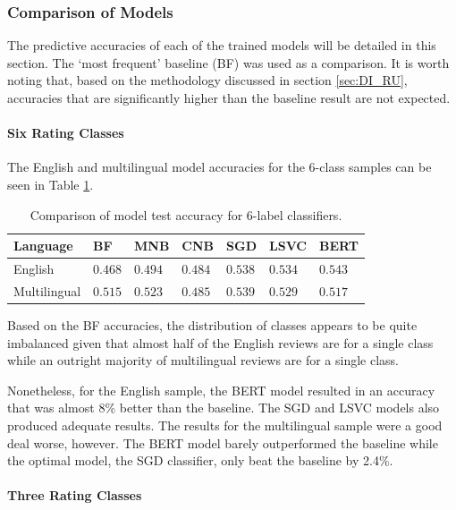 \subsubsection{Comparison of Models}

The predictive accuracies of each of the trained models will be detailed in this section. The `most frequent' baseline (BF) was used as a comparison. It is worth noting that, based on the methodology discussed in section \ref{sec:DI_RU}, accuracies that are significantly higher than the baseline result are not expected.

\paragraph{Six Rating Classes}

The English and multilingual model accuracies for the 6-class samples can be seen in Table \ref{tab:Res_PU_Comp6}.

\begin{table}[ht]
    \centering
    \begin{tabular}{l | l l l l l l}
        \toprule
        \textbf{Language} & \textbf{BF} & \textbf{MNB} & \textbf{CNB} & \textbf{SGD} & \textbf{LSVC} & \textbf{BERT}\\\midrule
        English&$0.468$&$0.494$&$0.484$&$0.538$&$0.534$&$\mathbf{0.543}$\\
        Multilingual&$0.515$&$0.523$&$0.485$&$\mathbf{0.539}$&$0.529$&$0.517$\\
        \bottomrule
    \end{tabular}
    \caption{Comparison of model test accuracy for 6-label classifiers.}
    \label{tab:Res_PU_Comp6}
\end{table}

Based on the BF accuracies, the distribution of classes appears to be quite imbalanced given that almost half of the English reviews are for a single class while an outright majority of multilingual reviews are for a single class.

Nonetheless, for the English sample, the BERT model resulted in an accuracy that was almost 8\% better than the baseline. The SGD and LSVC models also produced adequate results. The results for the multilingual sample were a good deal worse, however. The BERT model barely outperformed the baseline while the optimal model, the SGD classifier, only beat the baseline by 2.4\%.

\paragraph{Three Rating Classes}

